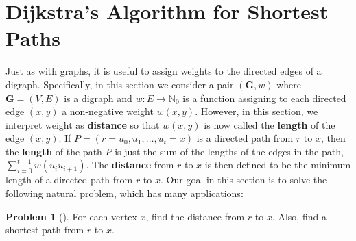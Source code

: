\documentclass[10pt,]{book}
\newcommand{\terminology}[1]{\textbf{#1}}
\theoremstyle{plain}
\theoremstyle{definition}
\theoremstyle{definition}
\theoremstyle{definition}
\newtheorem{problem}[theorem]{Problem}
\theoremstyle{definition}
\numberwithin{equation}{section}
\newcommand{\nonnegints}{\mathbb{N}_0}
\newcommand{\GVE}{\mathbf{G}=(V,E)}
\newcommand{\bfG}{\mathbf{G}}
\begin{document}
\section[{Dijkstra's Algorithm for Shortest Paths}]{Dijkstra's Algorithm for Shortest Paths}\label{s_graphalgorithms_shortest-paths}
\hypertarget{p-187}{}%
Just as with graphs, it is useful to assign weights to the directed edges of a digraph. Specifically, in this section we consider a pair \((\bfG,w)\) where \(\GVE\) is a digraph and \(w\colon E\rightarrow\nonnegints\) is a function assigning to each directed edge \((x,y)\) a non-negative weight \(w(x,y)\). However, in this section, we interpret weight as \terminology{distance} so that \(w(x,y)\) is now called the \terminology{length} of the edge \((x,y)\). If \(P=(r=u_0,u_1,\dots,u_t=x)\) is a directed path from \(r\) to \(x\), then the \terminology{length} of the path \(P\) is just the sum of the lengths of the edges in the path, \(\sum_{i=0}^{t-1} w(u_iu_{i+1})\). The \terminology{distance} from \(r\) to \(x\) is then defined to be the minimum length of a directed path from \(r\) to \(x\). Our goal in this section is to solve the following natural problem, which has many applications:%
\begin{problem}[]\label{problem-2}
\hypertarget{p-188}{}%
For each vertex \(x\), find the distance from \(r\) to \(x\). Also, find a shortest path from \(r\) to \(x\).%
\end{problem}
\typeout{************************************************}
\typeout{************************************************}
\end{document}
